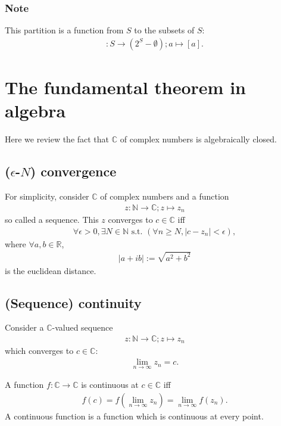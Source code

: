 \documentclass[11pt]{book}
\begin{document}
\subsubsection{Note}
This partition is a function from $S$ to the subsets of $S$:
\begin{eqnarray}
[] : S \to (2^S - \emptyset); a \mapsto [a].
\end{eqnarray}


\section{The fundamental theorem in algebra}
Here we review the fact that $\mathbb{C}$ of complex numbers is algebraically closed.

\subsection{($\epsilon$-$N$) convergence}
For simplicity, consider $\mathbb{C}$ of complex numbers and a function
\begin{eqnarray}
z: \mathbb{N} \to \mathbb{C}; z\mapsto z_n
\end{eqnarray}
so called a sequence.
This $z$ converges to $c \in \mathbb{C}$ iff
\begin{eqnarray}
\forall \epsilon > 0, \exists N \in \mathbb{N} \text{ s.t. } (\forall n \geq N, |c - z_n| < \epsilon),
\end{eqnarray}
where $\forall a ,b \in \mathbb{R}$,
\begin{eqnarray}
|a + ib| :=  \sqrt{a^2 + b^2}
\end{eqnarray}
is the euclidean distance.

\subsection{(Sequence) continuity}
Consider a $\mathbb{C}$-valued sequence
\begin{eqnarray}
z: \mathbb{N} \to \mathbb{C}; z\mapsto z_n
\end{eqnarray}
which converges to $c \in \mathbb{C}$:
\begin{eqnarray}
\lim_{n \to \infty} z_n = c.
\end{eqnarray}

A function $f: \mathbb{C} \to \mathbb{C}$ is continuous at $c \in \mathbb{C}$ iff
\begin{eqnarray}
f(c) = f\left( \lim_{n \to \infty} z_n \right) = \lim_{n \to \infty} f(z_n).
\end{eqnarray}
A continuous function is a function which is continuous at every point.
\end{document}
